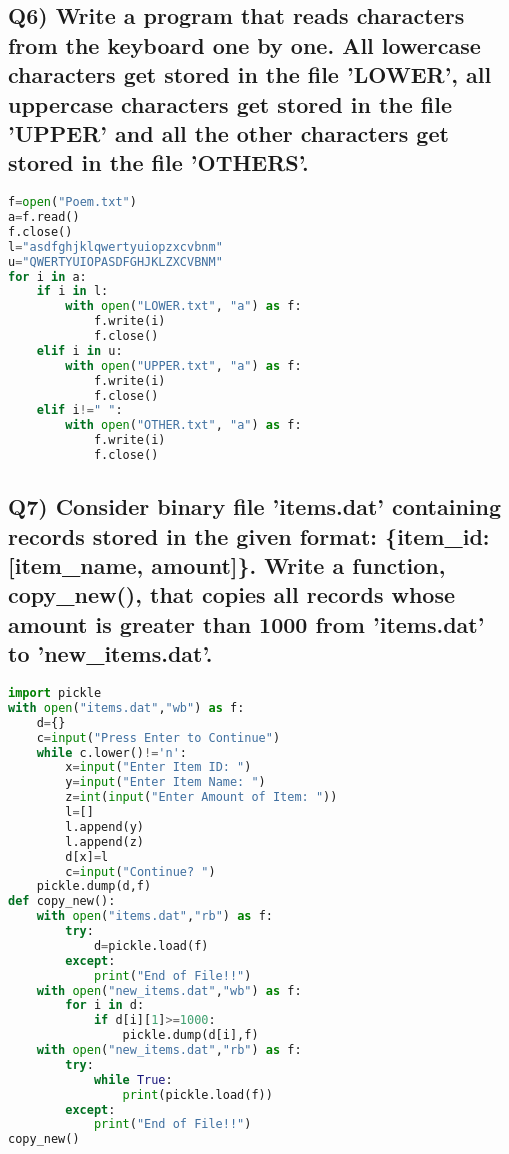 \documentclass{article}
\begin{document}
\subsection*{Q6) Write a program that reads characters from the keyboard one by one. All lowercase characters get stored in the file 'LOWER', all uppercase characters get stored in the file 'UPPER' and all the other characters get stored in the file 'OTHERS'.}
\begin{lstlisting}[language=Python]
f=open("Poem.txt")
a=f.read()
f.close()
l="asdfghjklqwertyuiopzxcvbnm"
u="QWERTYUIOPASDFGHJKLZXCVBNM"
for i in a:
    if i in l:
        with open("LOWER.txt", "a") as f:
            f.write(i)
            f.close()
    elif i in u:
        with open("UPPER.txt", "a") as f:
            f.write(i)
            f.close()
    elif i!=" ":
        with open("OTHER.txt", "a") as f:
            f.write(i)
            f.close()
\end{lstlisting}

\subsection*{Q7) Consider binary file 'items.dat' containing records stored in the given format: \{item\_id: [item\_name, amount]\}. Write a function, copy\_new(), that copies all records whose amount is greater than 1000 from 'items.dat' to 'new\_items.dat'.}
\begin{lstlisting}[language=Python]
import pickle
with open("items.dat","wb") as f:
    d={}
    c=input("Press Enter to Continue")
    while c.lower()!='n':
        x=input("Enter Item ID: ")
        y=input("Enter Item Name: ")
        z=int(input("Enter Amount of Item: "))
        l=[]
        l.append(y)
        l.append(z)
        d[x]=l
        c=input("Continue? ")
    pickle.dump(d,f)
def copy_new():
    with open("items.dat","rb") as f:
        try:
            d=pickle.load(f)
        except:
            print("End of File!!")
    with open("new_items.dat","wb") as f:
        for i in d:
            if d[i][1]>=1000:
                pickle.dump(d[i],f)
    with open("new_items.dat","rb") as f:
        try:
            while True:
                print(pickle.load(f))
        except:
            print("End of File!!")
copy_new()
\end{lstlisting}
\end{document}
